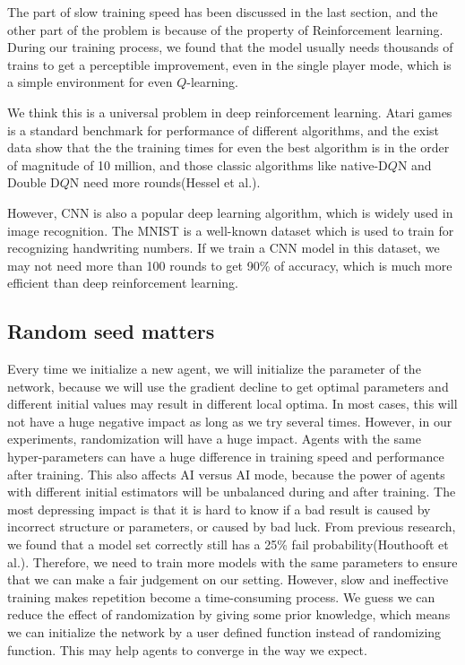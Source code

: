 \documentclass[12pt]{article}
\begin{document}
The part of slow training speed has been discussed in the last section, and the other part of the problem is because of the property of Reinforcement learning. During our training process, we found that the model usually needs thousands of trains to get a perceptible improvement, even in the single player mode, which is a simple environment for even $Q$-learning.

We think this is a universal problem in deep reinforcement learning. Atari games is a standard benchmark for performance of different algorithms, and the exist data show that the the training times for even the best algorithm is in the order of magnitude of 10 million, and those classic algorithms like native-D$Q$N and Double D$Q$N need more rounds(Hessel et al.).

However, CNN is also a popular deep learning algorithm, which is widely used in image recognition. The MNIST is a well-known dataset which is used to train for recognizing handwriting numbers. If we train a CNN model in this dataset, we may not need more than 100 rounds to get 90\% of accuracy, which is much more efficient than deep reinforcement learning.

\subsection{Random seed matters}
Every time  we initialize a new agent, we will initialize the parameter of the network, because we will use the gradient decline to get optimal parameters and different initial values may result in different local optima. In most cases, this will not have a huge negative impact as long as we try several times.
However, in our experiments, randomization will have a huge impact. Agents with the same hyper-parameters can have a huge difference in training speed and  performance after training. This also affects AI versus AI mode, because the power of agents with different initial estimators will be unbalanced during and after training.
The most depressing impact is that it is hard to know if a bad result is caused by incorrect structure or parameters, or caused by bad luck. From previous research, we found that a model set correctly still has a 25\% fail probability(Houthooft et al.). Therefore, we need to train more models with the same parameters to ensure that we can make a fair judgement on our setting. However, slow and ineffective training makes repetition become a time-consuming process.
We guess we can reduce the effect of randomization by giving some prior knowledge, which means we can initialize the network by a user defined function instead of randomizing function. This may help agents to converge in the way we expect.
\end{document}
